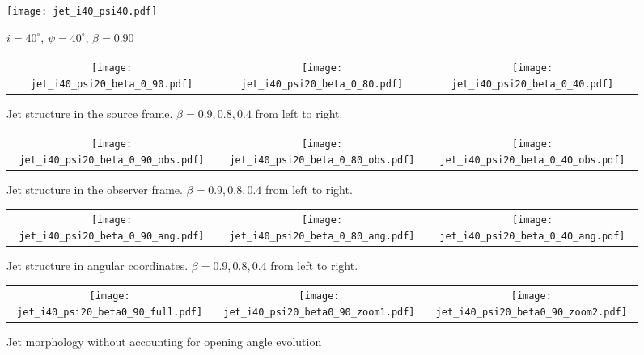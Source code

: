 \documentclass[iop]{emulateapj}
\begin{document}
\begin{figure}
  \begin{center}
    \texttt{[image: jet\_i40\_psi40.pdf]}
  \end{center}
  \caption{$i=40^\circ$, $\psi=40^\circ$, $\beta=0.90$}
\end{figure}

\clearpage

\begin{figure*}
\begin{center}
  \begin{tabular}{ccc}
    \texttt{[image: jet\_i40\_psi20\_beta\_0\_90.pdf]} &
    \texttt{[image: jet\_i40\_psi20\_beta\_0\_80.pdf]} &
    \texttt{[image: jet\_i40\_psi20\_beta\_0\_40.pdf]}
  \end{tabular}
\end{center}
\caption{Jet structure in the source frame. $\beta=0.9, 0.8, 0.4$ from left to right.}
\label{fig:srcframe}
\end{figure*}

\begin{figure*}
\begin{center}
  \begin{tabular}{ccc}
    \texttt{[image: jet\_i40\_psi20\_beta\_0\_90\_obs.pdf]} &
    \texttt{[image: jet\_i40\_psi20\_beta\_0\_80\_obs.pdf]} &
    \texttt{[image: jet\_i40\_psi20\_beta\_0\_40\_obs.pdf]}
  \end{tabular}
\end{center}
\caption{Jet structure in the observer frame. $\beta=0.9, 0.8, 0.4$ from left to right.}
\label{fig:obsframe}
\end{figure*}

\begin{figure*}
\begin{center}
  \begin{tabular}{ccc}
    \texttt{[image: jet\_i40\_psi20\_beta\_0\_90\_ang.pdf]} &
    \texttt{[image: jet\_i40\_psi20\_beta\_0\_80\_ang.pdf]} &
    \texttt{[image: jet\_i40\_psi20\_beta\_0\_40\_ang.pdf]}
  \end{tabular}
\end{center}
\caption{Jet structure in angular coordinates. $\beta=0.9, 0.8, 0.4$ from left to right.}
\label{fig:ang}
\end{figure*}

\begin{figure*}
\begin{center}
  \begin{tabular}{ccc}
    \texttt{[image: jet\_i40\_psi20\_beta0\_90\_full.pdf]} &
    \texttt{[image: jet\_i40\_psi20\_beta0\_90\_zoom1.pdf]} &
    \texttt{[image: jet\_i40\_psi20\_beta0\_90\_zoom2.pdf]}
  \end{tabular}
\end{center}
\caption{Jet morphology without accounting for opening angle
    evolution}
\label{fig:jet_nopsi}
\end{figure*}
\end{document}
